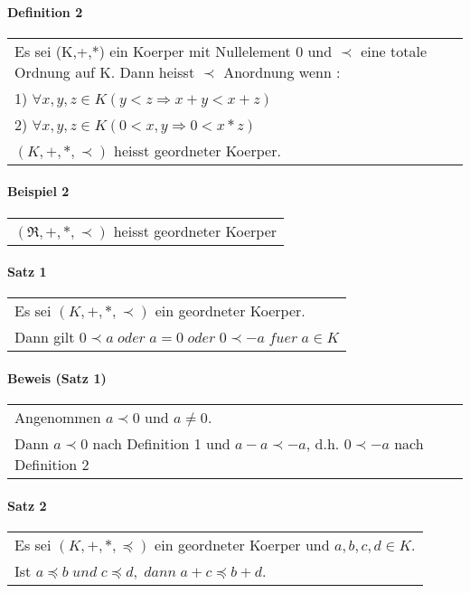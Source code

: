 \documentclass{scrartcl}
\begin{document}
\paragraph{Definition 2}
\begin{tabbing}
\begin{tabular}{l}
Es sei (K,+,*) ein Koerper mit Nullelement 0 und $ \prec $ eine totale Ordnung auf K. Dann heisst $ \prec $ Anordnung wenn : \\
1) $ \forall x,y,z \in K (y<z \Rightarrow x+y < x+z) $ \\
2) $ \forall x,y,z \in K (0<x,y \Rightarrow 0<x*z) $\\
$ (K,+,*,\prec) $ heisst geordneter Koerper.
\end{tabular}
\end{tabbing}

\paragraph{Beispiel 2}
\begin{tabbing}
\begin{tabular}{l}
$( \Re ,+,*, \prec ) $ heisst geordneter Koerper
\end{tabular}
\end{tabbing}

\paragraph{Satz 1}
\begin{tabbing}
\begin{tabular}{l}
Es sei $ (K,+,*,\prec) $ ein geordneter Koerper.\\
Dann gilt $ 0\prec a \; oder \; a=0 \; oder \; 0\prec -a \; fuer \; a \in K $
\end{tabular}
\end{tabbing}

\paragraph{Beweis (Satz 1)}
\begin{tabbing}
\begin{tabular}{l}
Angenommen $ a \prec 0 $ und $ a \neq 0 $.\\
Dann $ a \prec 0  $ nach Definition 1 und $ a-a \prec -a $, d.h.
$ 0 \prec -a $ nach Definition 2
\end{tabular}
\end{tabbing}

\paragraph{Satz 2}
\begin{tabbing}
\begin{tabular}{l}
Es sei $ (K,+,*,\preceq) $ ein geordneter Koerper und $ a,b,c,d \in K $.\\
Ist $ a \preceq b\; und\; c \preceq d,\; dann\; a+c \preceq b+d. $
\end{tabular}
\end{tabbing}
\end{document}
